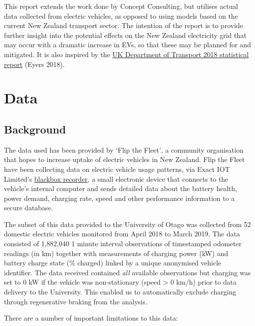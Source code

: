 \documentclass[]{article}
\begin{document}
This report extends the work done by Concept Consulting, but utilises actual data collected from electric vehicles, as opposed to using models based on the current New Zealand transport sector. The intention of the report is to provide further insight into the potential effects on the New Zealand electricity grid that may occur with a dramatic increase in EVs, so that these may be planned for and mitigated. It is also inspired by the \href{https://assets.publishing.service.gov.uk/government/uploads/system/uploads/attachment_data/file/764270/electric-chargepoint-analysis-2017-domestics.pdf}{UK Department of Transport 2018 statistical report} (Eyers 2018).

\hypertarget{data}{%
\section{Data}\label{data}}

\hypertarget{background}{%
\subsection{Background}\label{background}}

The data used has been provided by `Flip the Fleet', a community organisation that hopes to increase uptake of electric vehicles in New Zealand. Flip the Fleet have been collecting data on electric vehicle usage patterns, via Exact IOT Limited's \href{https://flipthefleet.org/ev-black-box/}{blackbox recorder}, a small electronic device that connects to the vehicle's internal computer and sends detailed data about the battery health, power demand, charging rate, speed and other performance information to a secure database.

The subset of this data provided to the University of Otago was collected from 52 domestic electric vehicles monitored from April 2018 to March 2019. The data consisted of 1,882,040 1 minute interval observations of timestamped odometer readings (in km) together with measurements of charging power (kW) and battery charge state (\% charged) linked by a unique anonymised vehicle identifier. The data received contained \emph{all} available observations but charging was set to 0 kW if the vehicle was non-stationary (speed \textgreater{} 0 km/h) prior to data delivery to the University. This enabled us to automatically exclude charging through regenerative braking from the analysis.

There are a number of important limitations to this data:
\end{document}
